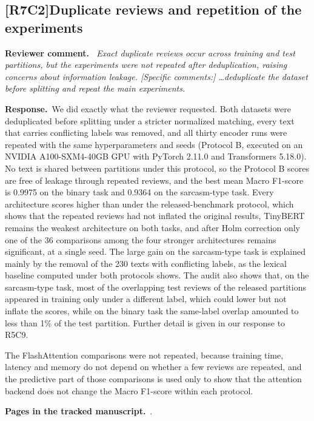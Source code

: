 \documentclass[11pt,a4paper]{article}
\newcommand{\comment}[3]{\subsection*{\textcolor{#1}{[#2]}\enspace #3}}
\newenvironment{reviewercomment}{\par\noindent\textbf{Reviewer comment.}\itshape\ }{\par}
\newcommand{\response}{\par\noindent\textbf{Response.}\ }
\newcommand{\where}[1]{\par\noindent\textbf{Pages in the tracked manuscript.}\ \rvpages[M-]{#1}.}
\begin{document}
\comment{rvBoth}{R7C2}{Duplicate reviews and repetition of the experiments}
\begin{reviewercomment}
Exact duplicate reviews occur across training and test partitions, but the experiments were not repeated after deduplication, raising concerns about information leakage. [Specific comments:] \ldots deduplicate the dataset before splitting and repeat the main experiments.
\end{reviewercomment}
\response We did exactly what the reviewer requested. Both datasets were deduplicated before splitting under a stricter normalized matching, every text that carries conflicting labels was removed, and all thirty encoder runs were repeated with the same hyperparameters and seeds (Protocol B, executed on an NVIDIA A100-SXM4-40GB GPU with PyTorch 2.11.0 and Transformers 5.18.0). No text is shared between partitions under this protocol, so the Protocol B scores are free of leakage through repeated reviews, and the best mean Macro F1-score is 0.9975 on the binary task and 0.9364 on the sarcasm-type task. Every architecture scores higher than under the released-benchmark protocol, which shows that the repeated reviews had not inflated the original results, TinyBERT remains the weakest architecture on both tasks, and after Holm correction only one of the 36 comparisons among the four stronger architectures remains significant, at a single seed. The large gain on the sarcasm-type task is explained mainly by the removal of the 230 texts with conflicting labels, as the lexical baseline computed under both protocols shows. The audit also shows that, on the sarcasm-type task, most of the overlapping test reviews of the released partitions appeared in training only under a different label, which could lower but not inflate the scores, while on the binary task the same-label overlap amounted to less than 1\% of the test partition. Further detail is given in our response to R5C9.

The FlashAttention comparisons were not repeated, because training time, latency and memory do not depend on whether a few reviews are repeated, and the predictive part of those comparisons is used only to show that the attention backend does not change the Macro F1-score within each protocol.

\where{R7C2}
\end{document}
